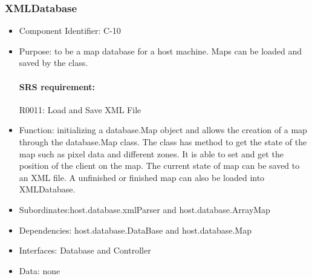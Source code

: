 \documentclass[11pt, a4paper]{report}
\begin{document}
\subsubsection{XMLDatabase}
\begin{itemize}
\item Component Identifier: C-10
\item Purpose: to be a map database for a host machine. Maps can be loaded and saved by the 
class. 
\paragraph{SRS requirement:} R0011: Load and Save XML File
\item Function: initializing a  database.Map object and allows the creation of a map through
the database.Map class. The class has method to get the state of the map such as pixel data and
different zones. It is able to set and get the position of the client on the map. The current state
of map can be saved to an XML file. A unfinished or finished map can also be loaded into XMLDatabase. 
\item Subordinates:host.database.xmlParser and host.database.ArrayMap
\item Dependencies: host.database.DataBase and host.database.Map
\item Interfaces: Database and Controller
\item Data: none
\end{itemize}

\end{document}
